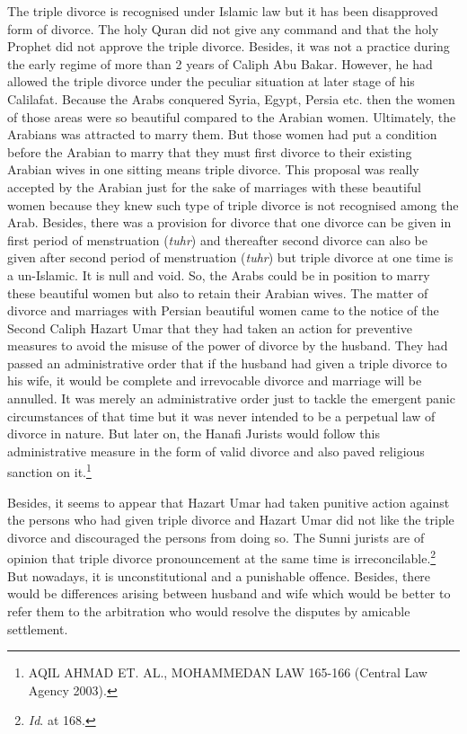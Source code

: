 \begin{multicols}{2}
\noi
The triple divorce is recognised under Islamic law but it has been disapproved form of
divorce. The holy Quran did not give any command and that the holy Prophet did not approve
the triple divorce. Besides, it was not a practice during the early regime of more than 2 years
of Caliph Abu Bakar. However, he had allowed the triple divorce under the peculiar situation
at later stage of his Calilafat. Because the Arabs conquered Syria, Egypt, Persia etc. then the
women of those areas were so beautiful compared to the Arabian women. Ultimately, the
Arabians was attracted to marry them. But those women had put a condition before the
Arabian to marry that they must first divorce to their existing Arabian wives in one sitting
means triple divorce. This proposal was really accepted by the Arabian just for the sake of
marriages with these beautiful women because they knew such type of triple divorce is not
recognised among the Arab. Besides, there was a provision for divorce that one divorce can
be given in first period of menstruation ({\it tuhr}) and thereafter second divorce can also be given
after second period of menstruation ({\it tuhr}) but triple divorce at one time is a un-Islamic. It is
null and void. So, the Arabs could be in position to marry these beautiful women but also to
retain their Arabian wives. The matter of divorce and marriages with Persian beautiful
women came to the notice of the Second Caliph Hazart Umar that they had taken an action
for preventive measures to avoid the misuse of the power of divorce by the husband. They
had passed an administrative order that if the husband had given a triple divorce to his wife, it
would be complete and irrevocable divorce and marriage will be annulled. It was merely an
administrative order just to tackle the emergent panic circumstances of that time but it was
never intended to be a perpetual law of divorce in nature. But later on, the Hanafi Jurists
would follow this administrative measure in the form of valid divorce and also paved
religious sanction on it.\footnote{ AQIL AHMAD ET. AL., MOHAMMEDAN LAW 165-166 (Central Law Agency 2003).} 

\noi
Besides, it seems to appear that Hazart Umar had taken punitive action against the persons
who had given triple divorce and Hazart Umar did not like the triple divorce and discouraged
the persons from doing so. The Sunni jurists are of opinion that triple divorce pronouncement
at the same time is irreconcilable.\footnote{{\it Id}. at 168.} But nowadays, it is unconstitutional and a punishable
offence. Besides, there would be differences arising between husband and wife which would
be better to refer them to the arbitration who would resolve the disputes by amicable
settlement.


\end{multicols}
